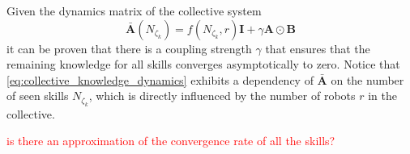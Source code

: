 Given the dynamics matrix of the collective system
\begin{equation}
	\bar{\bm{A}}\left(N_{\zeta_k}\right) = f\left(N_{\zeta_k},r\right) \bm{I} + \gamma \bm{A} \odot \bm{B} 
\end{equation} 
it can be proven that there is a coupling strength $\gamma$ that ensures that the remaining knowledge for all skills converges asymptotically to zero. Notice that \eqref{eq:collective_knowledge_dynamics} exhibits a dependency of $\bar{\bm{A}}$ on the number of seen skills $N_{\zeta_k}$, which is directly influenced by the number of robots $r$ in the collective.

\TODO \textcolor{red}{is there an approximation of the convergence rate of all the skills?}


